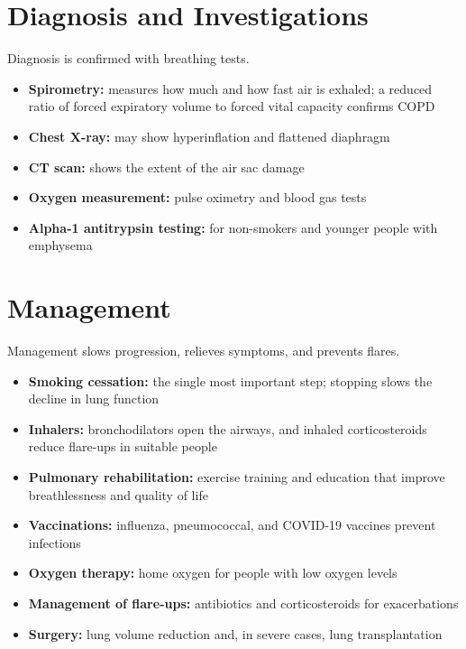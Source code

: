 \section*{Diagnosis and Investigations}
Diagnosis is confirmed with breathing tests.
\begin{itemize}
    \item \textbf{Spirometry:} measures how much and how fast air is exhaled; a reduced ratio of forced expiratory volume to forced vital capacity confirms COPD
    \item \textbf{Chest X-ray:} may show hyperinflation and flattened diaphragm
    \item \textbf{CT scan:} shows the extent of the air sac damage
    \item \textbf{Oxygen measurement:} pulse oximetry and blood gas tests
    \item \textbf{Alpha-1 antitrypsin testing:} for non-smokers and younger people with emphysema
\end{itemize}

\section*{Management}
Management slows progression, relieves symptoms, and prevents flares.
\begin{itemize}
    \item \textbf{Smoking cessation:} the single most important step; stopping slows the decline in lung function
    \item \textbf{Inhalers:} bronchodilators open the airways, and inhaled corticosteroids reduce flare-ups in suitable people
    \item \textbf{Pulmonary rehabilitation:} exercise training and education that improve breathlessness and quality of life
    \item \textbf{Vaccinations:} influenza, pneumococcal, and COVID-19 vaccines prevent infections
    \item \textbf{Oxygen therapy:} home oxygen for people with low oxygen levels
    \item \textbf{Management of flare-ups:} antibiotics and corticosteroids for exacerbations
    \item \textbf{Surgery:} lung volume reduction and, in severe cases, lung transplantation
\end{itemize}

